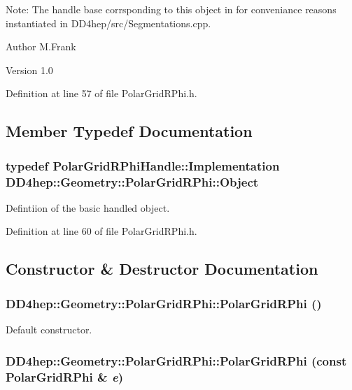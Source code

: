 Note: The handle base corrsponding to this object in for conveniance reasons instantiated in DD4hep/src/Segmentations.cpp.

\begin{DoxyAuthor}{Author}
M.Frank 
\end{DoxyAuthor}
\begin{DoxyVersion}{Version}
1.0 
\end{DoxyVersion}


Definition at line 57 of file PolarGridRPhi.h.

\subsection{Member Typedef Documentation}
\hypertarget{class_d_d4hep_1_1_geometry_1_1_polar_grid_r_phi_aebd15faef8872b8331cb2a153d5665bd}{
\subsubsection[{Object}]{\setlength{\rightskip}{0pt plus 5cm}typedef {\bf PolarGridRPhiHandle::Implementation} {\bf DD4hep::Geometry::PolarGridRPhi::Object}}}
\label{class_d_d4hep_1_1_geometry_1_1_polar_grid_r_phi_aebd15faef8872b8331cb2a153d5665bd}


Defintiion of the basic handled object. 

Definition at line 60 of file PolarGridRPhi.h.

\subsection{Constructor \& Destructor Documentation}
\hypertarget{class_d_d4hep_1_1_geometry_1_1_polar_grid_r_phi_a1943b006410ada69da167db39a382427}{
\subsubsection[{PolarGridRPhi}]{\setlength{\rightskip}{0pt plus 5cm}DD4hep::Geometry::PolarGridRPhi::PolarGridRPhi ()}}
\label{class_d_d4hep_1_1_geometry_1_1_polar_grid_r_phi_a1943b006410ada69da167db39a382427}


Default constructor. \hypertarget{class_d_d4hep_1_1_geometry_1_1_polar_grid_r_phi_ad5916c16a7d6a1b66bb68c752ceae0ad}{
\subsubsection[{PolarGridRPhi}]{\setlength{\rightskip}{0pt plus 5cm}DD4hep::Geometry::PolarGridRPhi::PolarGridRPhi (const {\bf PolarGridRPhi} \& {\em e})}}
\label{class_d_d4hep_1_1_geometry_1_1_polar_grid_r_phi_ad5916c16a7d6a1b66bb68c752ceae0ad}



